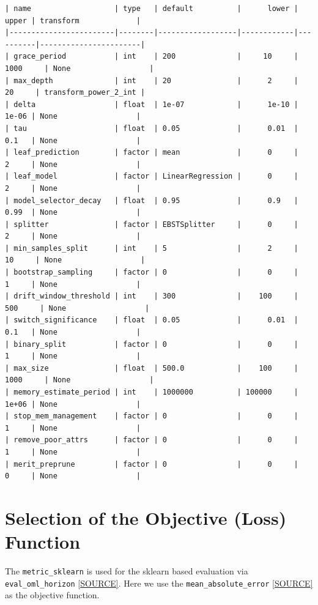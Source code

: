 \documentclass[
  letterpaper,
  DIV=11,
  numbers=noendperiod]{scrreprt}
\begin{document}
\begin{verbatim}
| name                   | type   | default          |      lower |    upper | transform             |
|------------------------|--------|------------------|------------|----------|-----------------------|
| grace_period           | int    | 200              |     10     | 1000     | None                  |
| max_depth              | int    | 20               |      2     |   20     | transform_power_2_int |
| delta                  | float  | 1e-07            |      1e-10 |    1e-06 | None                  |
| tau                    | float  | 0.05             |      0.01  |    0.1   | None                  |
| leaf_prediction        | factor | mean             |      0     |    2     | None                  |
| leaf_model             | factor | LinearRegression |      0     |    2     | None                  |
| model_selector_decay   | float  | 0.95             |      0.9   |    0.99  | None                  |
| splitter               | factor | EBSTSplitter     |      0     |    2     | None                  |
| min_samples_split      | int    | 5                |      2     |   10     | None                  |
| bootstrap_sampling     | factor | 0                |      0     |    1     | None                  |
| drift_window_threshold | int    | 300              |    100     |  500     | None                  |
| switch_significance    | float  | 0.05             |      0.01  |    0.1   | None                  |
| binary_split           | factor | 0                |      0     |    1     | None                  |
| max_size               | float  | 500.0            |    100     | 1000     | None                  |
| memory_estimate_period | int    | 1000000          | 100000     |    1e+06 | None                  |
| stop_mem_management    | factor | 0                |      0     |    1     | None                  |
| remove_poor_attrs      | factor | 0                |      0     |    1     | None                  |
| merit_preprune         | factor | 0                |      0     |    0     | None                  |
\end{verbatim}

\hypertarget{selection-of-the-objective-loss-function}{%
\section{Selection of the Objective (Loss)
Function}\label{selection-of-the-objective-loss-function}}

The \texttt{metric\_sklearn} is used for the sklearn based evaluation
via \texttt{eval\_oml\_horizon}
\href{https://github.com/sequential-parameter-optimization/spotRiver/blob/main/src/spotRiver/evaluation/eval_bml.py}{{[}SOURCE{]}}.
Here we use the \texttt{mean\_absolute\_error}
\href{https://scikit-learn.org/stable/modules/generated/sklearn.metrics.mean_absolute_error.html}{{[}SOURCE{]}}
as the objective function.
\end{document}
